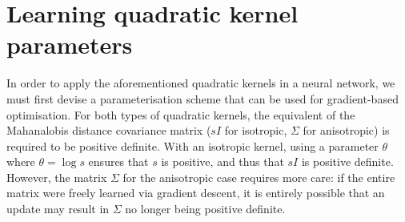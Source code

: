 \documentclass[a4paper, 12pt]{report}
\begin{document}
\section{Learning quadratic kernel parameters}
\label{sec:learning-pdm}
In order to apply the aforementioned quadratic kernels in a neural network, we must first devise a parameterisation scheme that can be used for gradient-based optimisation. For both types of quadratic kernels, the equivalent of the Mahanalobis distance covariance matrix ($sI$ for isotropic, $\Sigma$ for anisotropic) is required to be positive definite. With an isotropic kernel, using a parameter $\theta$ where $\theta = \log s$ ensures that $s$ is positive, and thus that $sI$ is positive definite. However, the matrix $\Sigma$ for the anisotropic case requires more care: if the entire matrix were freely learned via gradient descent, it is entirely possible that an update may result in $\Sigma$ no longer being positive definite.
\end{document}

